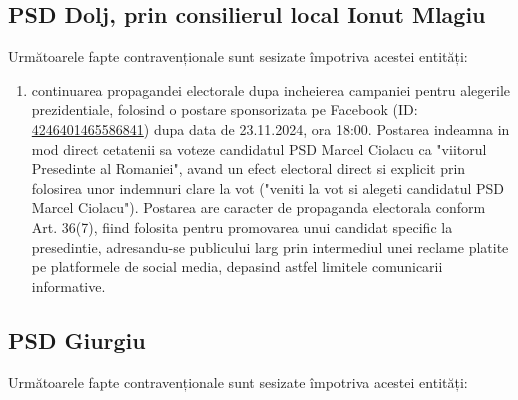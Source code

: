 \documentclass[a4paper,12pt]{article}
\begin{document}
\subsection{PSD Dolj, prin consilierul local Ionut Mlagiu}
Următoarele fapte contravenționale sunt sesizate împotriva acestei entități:

\begin{enumerate}[leftmargin=*, label=\arabic*.)]
    \item continuarea propagandei electorale dupa incheierea campaniei pentru alegerile prezidentiale, folosind o postare sponsorizata pe Facebook (ID: \href{https://www.facebook.com/ads/library/?id=4246401465586841}{4246401465586841}) dupa data de 23.11.2024, ora 18:00. Postarea indeamna in mod direct cetatenii sa voteze candidatul PSD Marcel Ciolacu ca "viitorul Presedinte al Romaniei", avand un efect electoral direct si explicit prin folosirea unor indemnuri clare la vot ("veniti la vot si alegeti candidatul PSD Marcel Ciolacu"). Postarea are caracter de propaganda electorala conform Art. 36(7), fiind folosita pentru promovarea unui candidat specific la presedintie, adresandu-se publicului larg prin intermediul unei reclame platite pe platformele de social media, depasind astfel limitele comunicarii informative.
\end{enumerate}

\vspace{0.5cm}

\subsection{PSD Giurgiu}
Următoarele fapte contravenționale sunt sesizate împotriva acestei entități:
\end{document}
